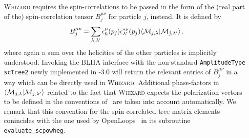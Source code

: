 \textsc{Whizard} requires the spin-correlations to be passed in the form of the (real  part of the) spin-correlation tensor $B_j^{\mu\nu}$ for particle $j$, instead. It is defined by
\begin{equation}
   B_j^{\mu\nu} = \sum_{\lambda,\lambda'}\epsilon_h^\mu(p_j)\epsilon_{\lambda'}^{*\nu}(p_j)\langle {\cal M}_{j,\lambda}|{\cal M}_{j,\lambda'}\rangle\,,
\end{equation}
where again a sum over the helicities of the other particles is implicitly understood. Invoking the BLHA interface with the non-standard \texttt{AmplitudeType scTree2} newly implemented in \gosam{}-3.0 will return the relevant entries of $B_j^{\mu\nu}$ in a way which can be directly used in \textsc{Whizard}. Additional phase-factors in $\langle {\cal M}_{j,\lambda}|{\cal M}_{j,\lambda'}\rangle$ related to the fact that \textsc{Whizard} expects the polarization vectors to be defined in the conventions of~\cite{Murayama:1992gi} are taken into account automatically. We remark that this convention for the spin-correlated tree matrix elements conincides with the one used by OpenLoops~\cite{Buccioni:2019sur} in its subroutine \texttt{evaluate\_scpowheg}.
